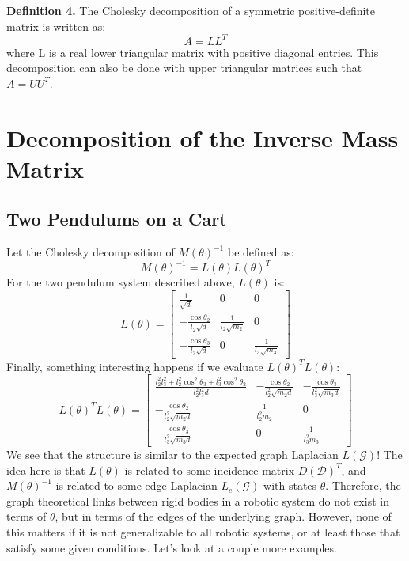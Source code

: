 \documentclass[conference]{IEEEtran}
\begin{document}
\noindent\textbf{Definition 4.} The Cholesky decomposition of a symmetric positive-definite matrix is written as:
$$
A=LL^T
$$
where L is a real lower triangular matrix with positive diagonal entries. This decomposition can also be done with upper triangular matrices such that $A=UU^T$.

\section{Decomposition of the Inverse Mass Matrix}

\subsection{Two Pendulums on a Cart}
Let the Cholesky decomposition of $M(\theta)^{-1}$ be defined as:
$$
M(\theta)^{-1}=L(\theta)L(\theta)^T
$$
For the two pendulum system described above, $L(\theta)$ is:
$$
L(\theta)=\left[\begin{matrix}
    \frac{1}{\sqrt{d}} & 0 & 0\\
    -\frac{\cos{\theta_2}}{l_{2} \sqrt{d}} & \frac{1}{l_2 \sqrt{m_2}} & 0\\
    -\frac{\cos{\theta_3}}{l_{3} \sqrt{d}} & 0 & \frac{1}{l_3 \sqrt{m_3}}
\end{matrix}\right]
$$
Finally, something interesting happens if we evaluate $L(\theta)^TL(\theta)$:
$$
L(\theta)^TL(\theta)=\left[\begin{matrix}
    \frac{l_2^2 l_3^2 + l_2^2 \cos^2\theta_3 + l_3^2 \cos^2\theta_2}{l_2^2 l_3^2 d} & -\frac{\cos\theta_2}{l_2^2 \sqrt{m_2 d}} & - \frac{\cos\theta_3}{l_3^2 \sqrt{m_3 d}}\\
    -\frac{\cos\theta_2}{l_2^2 \sqrt{m_2 d}} & \frac{1}{l_2^2 m_2} & 0\\
    -\frac{\cos\theta_3}{l_3^2 \sqrt{m_3 d}} & 0 & \frac{1}{l_3^2 m_3}
\end{matrix}\right]
$$
We see that the structure is similar to the expected graph Laplacian $L(\mathcal{G})$! The idea here is that $L(\theta)$ is related to some incidence matrix $D(\mathcal{D})^T$, and $M(\theta)^{-1}$ is related to some edge Laplacian $L_e(\mathcal{G})$ with states $\theta$. Therefore, the graph theoretical links between rigid bodies in a robotic system do not exist in terms of $\theta$, but in terms of the edges of the underlying graph. However, none of this matters if it is not generalizable to all robotic systems, or at least those that satisfy some given conditions. Let's look at a couple more examples.
\end{document}
